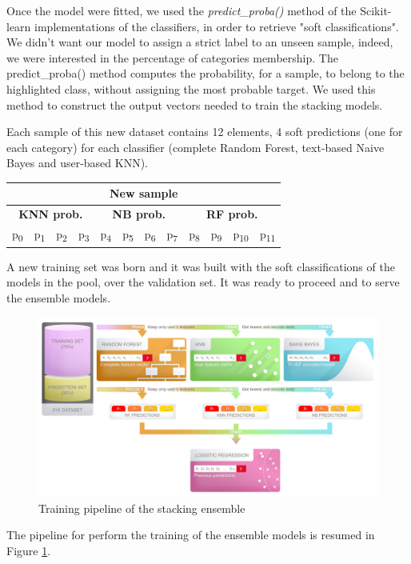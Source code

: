 Once the model were fitted, we used the \textit{predict\_proba()} method of the Scikit-learn implementations of the classifiers, in order to retrieve "soft classifications".
We didn't want our model to assign a strict label to an unseen sample, indeed, we were interested in the percentage of categories membership.
The predict\_proba() method computes the probability, for a sample, to belong to the highlighted class, without assigning the most probable target.
We used this method to construct the output vectors needed to train the stacking models.

Each sample of this new dataset contains 12 elements, 4 soft predictions (one for each category) for each classifier (complete Random Forest, text-based Naive Bayes and user-based KNN).

\begin{center}
	\begin{tabular}{@{}c|c|c|c|c|c|c|c|c|c|c|c@{}}
		\multicolumn{12}{c}{New sample} \\
		\hline
		\multicolumn{4}{c|}{\textbf{KNN prob.}} & 
		\multicolumn{4}{c|}{\textbf{NB prob.}} & 
		\multicolumn{4}{c}{\textbf{RF prob.}}\\
		\hline
		\multicolumn{1}{c|}{p\textsubscript{0}} &
		\multicolumn{1}{c|}{p\textsubscript{1}} &
		\multicolumn{1}{c|}{p\textsubscript{2}} &
		\multicolumn{1}{c|}{p\textsubscript{3}} &
		\multicolumn{1}{c|}{p\textsubscript{4}} &
		\multicolumn{1}{c|}{p\textsubscript{5}} &
		\multicolumn{1}{c|}{p\textsubscript{6}} &
		\multicolumn{1}{c|}{p\textsubscript{7}} &	
		\multicolumn{1}{c|}{p\textsubscript{8}} &
		\multicolumn{1}{c|}{p\textsubscript{9}} &
		\multicolumn{1}{c|}{p\textsubscript{10}} &
		\multicolumn{1}{c}{p\textsubscript{11}}\\
		\hline
	\end{tabular}
\end{center}

A new training set was born and it was built with the soft classifications of the models in the pool, over the validation set. It was ready to proceed and to serve the ensemble models.\\

\begin{figure}[htp!]
	\centering
	\includegraphics[width=\columnwidth]{chapter5/figure/stacking_train.png}
	\caption{Training pipeline of the stacking ensemble}
	\label{fig:stacking_pipeline}
\end{figure}
The pipeline for perform the training of the ensemble models is resumed in Figure \ref{fig:stacking_pipeline}.

